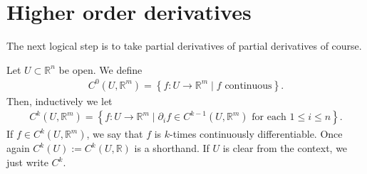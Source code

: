 \section{Higher order derivatives}

The next logical step is to take partial derivatives of partial derivatives of course.

\begin{definition}[Class $C^{k}$]\label{def:}
	Let $U \subset \mathbb{R}^{n}$ be open. We define
	\begin{align*}
		C^{0}(U, \mathbb{R}^{m}) = \left\{ f : U \to \mathbb{R}^{m} \mid f \text{ continuous} \right\}.
	\end{align*}
	Then, inductively we let
	\begin{align*}
		C^{k}(U, \mathbb{R}^{m}) = \left\{ f :U \to \mathbb{R}^{m} \mid \partial_{i}f \in C^{k-1}(U, \mathbb{R}^{m}) \text{ for each } 1 \leq i \leq n \right\}.
	\end{align*}
	If $f \in C^{k}(U, \mathbb{R}^{m})$, we say that $f$ is $k$-times continuously differentiable. Once again $C^{k}(U) := C^{k}(U, \mathbb{R})$ is a shorthand. If $U$ is clear from the context, we just write $C^{k}$.
\end{definition}

